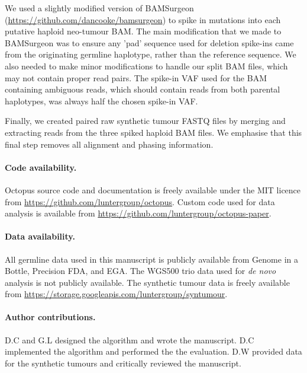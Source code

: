 \documentclass[notitlepage, twocolumn, 10pt]{article}
\begin{document}
We used a slightly modified version of BAMSurgeon (\url{https://github.com/dancooke/bamsurgeon}) to spike in mutations into each putative haploid neo-tumour BAM. The main modification that we made to BAMSurgeon was to ensure any 'pad' sequence used for deletion spike-ins came from the originating germline haplotype, rather than the reference sequence. We also needed to make minor modifications to handle our split BAM files, which may not contain proper read pairs. The spike-in VAF used for the BAM containing ambiguous reads, which should contain reads from both parental haplotypes, was always half the chosen spike-in VAF.

Finally, we created paired raw synthetic tumour FASTQ files by merging and extracting reads from the three spiked haploid BAM files. We emphasise that this final step removes all alignment and phasing information.

\paragraph*{Code availability.} Octopus source code and documentation is freely available under the MIT licence from \url{https://github.com/luntergroup/octopus}. Custom code used for data analysis is available from \url{https://github.com/luntergroup/octopus-paper}.

\paragraph*{Data availability.} All germline data used in this manuscript is publicly available from Genome in a Bottle, Precision FDA, and EGA. The WGS500 trio data used for \textit{de novo} analysis is not publicly available. The synthetic tumour data is freely available from \url{https://storage.googleapis.com/luntergroup/syntumour}.

\paragraph*{Author contributions.} D.C and G.L designed the algorithm and wrote the manuscript. D.C implemented the algorithm and performed the the evaluation. D.W provided data for the synthetic tumours and critically reviewed the manuscript. 
\end{document}
